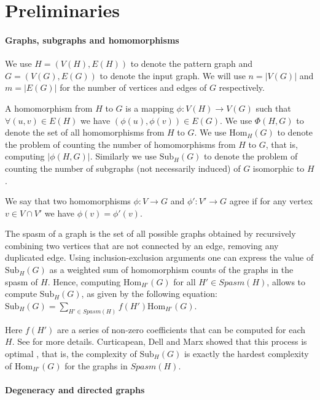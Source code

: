 \documentclass[a4paper,UKenglish,cleveref, autoref, numberwithinsect, thm-restate]{lipics-v2021}
\newcommand{\Hom}[2]{\mathrm{Hom}_{#2}(#1)}
\newcommand{\Sub}[2]{\mathrm{Sub}_{#2}(#1)}
\newcommand{\Spasm}{Spasm}
\begin{document}
	\section{Preliminaries} \label{sec:prelim}
	
	\paragraph*{Graphs, subgraphs and homomorphisms}
	
	We use $H = (V(H), E(H))$ to denote the pattern graph and $G = (V(G),E(G))$ to denote the input graph. We will use $n=|V(G)|$ and $m=|E(G)|$ for the number of vertices and edges of $G$ respectively.
	
	A homomorphism from $H$ to $G$ is a mapping $\phi: V(H) \to V(G)$ such that $\forall (u,v) \in E(H)$ we have $(\phi(u),\phi(v)) \in E(G)$. We use $\Phi(H,G)$ to denote the set of all homomorphisms from $H$ to $G$. We use $\Hom{G}{H}$ to denote the problem of counting the number of homomorphisms from $H$ to $G$, that is, computing $|\phi(H,G)|$. Similarly we use $\Sub{G}{H}$ to denote the problem of counting the number of subgraphs (not necessarily induced) of $G$ isomorphic to $H$.
	
	We say that two homomorphisms $\phi: V \to G$ and $\phi': V' \to G$ agree if for any vertex $v \in V \cap V'$ we have $\phi(v) = \phi'(v)$.
	
	The spasm of a graph is the set of all possible graphs obtained by recursively combining two vertices that are not connected by an edge, removing any duplicated edge. Using inclusion-exclusion arguments one can express the value of $\Sub{G}{H}$ as a weighted sum of homomorphism counts of the graphs in the spasm of $H$. Hence, computing $\Hom{G}{H'}$ for all $H'\in \Spasm(H)$, allows to compute $\Sub{G}{H}$, as given by the following equation: $\Sub{G}{H}  = \sum_{H' \in \Spasm(H)} f(H') \Hom{G}{H'}$.
	
	Here $f(H')$ are a series of non-zero coefficients that can be computed for each $H$. See \cite{BoChLo+06} for more details. Curticapean, Dell and Marx showed that this process is optimal \cite{CuDeMa17}, that is, the complexity of $\Sub{G}{H}$ is exactly the hardest complexity of $\Hom{G}{H'}$ for the graphs in $\Spasm(H)$.
	
	\paragraph*{Degeneracy and directed graphs}
	
\end{document}
